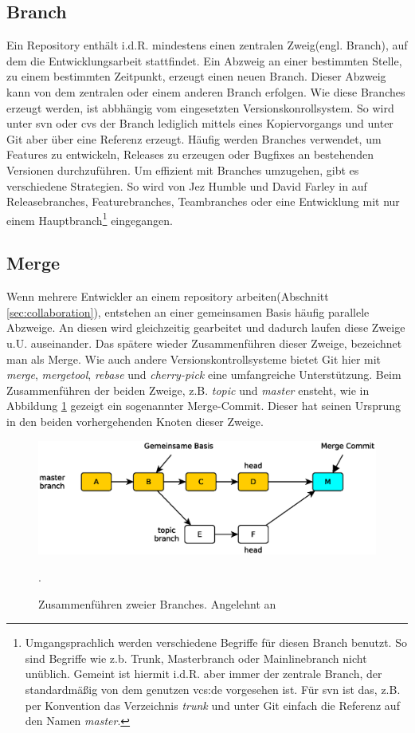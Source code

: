 \subsection{Branch}\label{sec:branch}
Ein Repository enthält i.d.R. mindestens einen zentralen Zweig(engl. Branch),
auf dem die Entwicklungsarbeit stattfindet. Ein Abzweig an einer bestimmten
Stelle, zu einem bestimmten Zeitpunkt, erzeugt einen neuen Branch. Dieser
Abzweig kann von dem zentralen oder einem anderen Branch erfolgen. Wie diese
Branches erzeugt werden, ist abbhängig vom eingesetzten Versionskonrollsystem.
So wird unter \acrshort{svn} oder \acrshort{cvs} der Branch lediglich mittels
eines Kopiervorgangs und unter Git aber über eine Referenz erzeugt. Häufig
werden Branches verwendet, um Features zu entwickeln, Releases zu erzeugen oder
Bugfixes an bestehenden Versionen durchzuführen\cite[S.~21]{gitosp}. Um
effizient mit Branches umzugehen, gibt es verschiedene Strategien. So wird von
Jez Humble und David Farley in \cite[S.~408-412]{cd} auf Releasebranches,
Featurebranches, Teambranches oder eine Entwicklung mit nur einem
Hauptbranch\footnote{Umgangsprachlich werden verschiedene Begriffe für diesen
Branch benutzt. So sind Begriffe wie z.b.  Trunk, Masterbranch oder
Mainlinebranch nicht unüblich. Gemeint ist hiermit i.d.R. aber immer der
zentrale Branch, der standardmäßig von dem genutzen \acrlong{vcs:de} vorgesehen
ist. Für \acrshort{svn} ist das, z.B. per Konvention das Verzeichnis
\textit{trunk} und unter Git einfach die Referenz auf den Namen
\textit{master}.} eingegangen.

\subsection{Merge}\label{sec:merge}
Wenn mehrere Entwickler an einem \gls{repository} arbeiten(Abschnitt
\ref{sec:collaboration}), entstehen an einer gemeinsamen Basis häufig parallele
Abzweige. An diesen wird gleichzeitig gearbeitet und dadurch laufen diese
Zweige u.U. auseinander. Das spätere wieder Zusammenführen dieser Zweige,
bezeichnet man als Merge. Wie auch andere Versionskontrollsysteme bietet Git
hier mit \textit{merge}, \textit{mergetool}, \textit{rebase} und
\textit{cherry-pick} eine umfangreiche Unterstützung\cite[S.~vii]{gitwf}. Beim
Zusammenführen der beiden Zweige, z.B. \textit{topic} und \textit{master}
ensteht, wie in Abbildung \ref{fig:merge} gezeigt ein sogenannter Merge-Commit.
Dieser hat seinen Ursprung in den beiden vorhergehenden Knoten dieser Zweige.

\begin{figure}[hb]
  \centering
  \includegraphics[scale=0.60]{images/merge.eps}
  \caption{Zusammenführen zweier Branches. Angelehnt an \cite[83]{gitosp}}.
  \label{fig:merge}
\end{figure}

